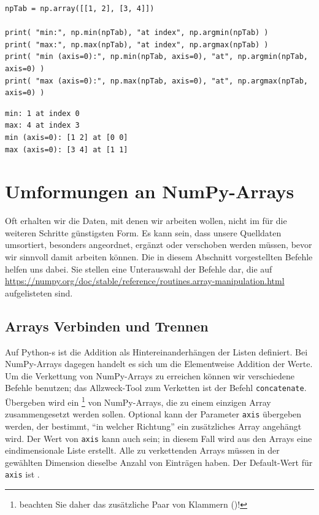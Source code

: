 \begin{codebox}
\begin{verbatim}
npTab = np.array([[1, 2], [3, 4]])

print( "min:", np.min(npTab), "at index", np.argmin(npTab) )
print( "max:", np.max(npTab), "at index", np.argmax(npTab) )
print( "min (axis=0):", np.min(npTab, axis=0), "at", np.argmin(npTab, axis=0) )
print( "max (axis=0):", np.max(npTab, axis=0), "at", np.argmax(npTab, axis=0) )
\end{verbatim}
\end{codebox}
%
\begin{cmdbox}
\begin{verbatim}
min: 1 at index 0
max: 4 at index 3
min (axis=0): [1 2] at [0 0]
max (axis=0): [3 4] at [1 1]
\end{verbatim}
\end{cmdbox}

\section{Umformungen an NumPy-Arrays}
Oft erhalten wir die Daten, mit denen wir arbeiten wollen, nicht im für die weiteren Schritte günstigsten Form. Es kann sein, dass unsere Quelldaten umsortiert, besonders angeordnet, ergänzt oder verschoben werden müssen, bevor wir sinnvoll damit arbeiten können. Die in diesem Abschnitt vorgestellten Befehle helfen uns dabei. Sie stellen eine Unterauswahl der Befehle dar, die auf \url{https://numpy.org/doc/stable/reference/routines.array-manipulation.html} aufgelisteten sind.

\subsection{Arrays Verbinden und Trennen}
Auf Python-s ist die Addition als Hintereinanderhängen der Listen definiert. Bei NumPy-Arrays dagegen handelt es sich um die Elementweise Addition der Werte. Um die Verkettung von NumPy-Arrays zu erreichen können wir verschiedene Befehle benutzen; das Allzweck-Tool zum Verketten ist der Befehl \texttt{concatenate}. Übergeben wird ein \footnote{beachten Sie daher das zusätzliche Paar von Klammern ()!} von NumPy-Arrays, die zu einem einzigen Array zusammengesetzt werden sollen. Optional kann der Parameter \texttt{axis} übergeben werden, der bestimmt, \enquote{in welcher Richtung} ein zusätzliches Array angehängt wird. Der Wert von \texttt{axis} kann auch  sein; in diesem Fall wird aus den Arrays eine eindimensionale Liste erstellt. Alle zu verkettenden Arrays müssen in der gewählten Dimension dieselbe Anzahl von Einträgen haben. Der Default-Wert für \texttt{axis} ist .


